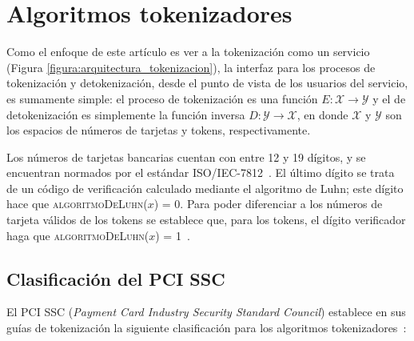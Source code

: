 %
%

\section{Algoritmos tokenizadores}
\label{sec:algoritmos}

Como el enfoque de este artículo es ver a la tokenización como un servicio
(Figura \ref{figura:arquitectura_tokenizacion}), la interfaz para los procesos
de tokenización y detokenización, desde el punto de vista de los usuarios del
servicio, es sumamente simple: el proceso de tokenización es una función $ E:
\mathcal{X} \rightarrow \mathcal{Y} $ y el de detokenización es  simplemente la
función inversa $ D: \mathcal{Y} \rightarrow \mathcal{X} $, en donde $
\mathcal{X} $ y $ \mathcal{Y} $ son los espacios de números de tarjetas y
tokens, respectivamente.

Los números de tarjetas bancarias cuentan con entre 12 y 19 dígitos, y se
encuentran normados por el estándar ISO/IEC-7812~\cite{iso_7812}. El último
dígito se trata de un código de verificación calculado mediante el algoritmo de
Luhn; este dígito hace que \textsc{algoritmoDeLuhn($ x $) = 0}. Para poder
diferenciar a los números de tarjeta válidos de los tokens se establece que,
para los tokens, el dígito verificador haga que
\textsc{algoritmoDeLuhn($ x $) = 1}~\cite{doc_sandra}.


\subsection{Clasificación del PCI SSC}
\label{sec:clasificacion}

El PCI SSC (\textit{Payment Card Industry Security Standard Council}) establece
en sus guías de tokenización la siguiente clasificación para los algoritmos
tokenizadores~\cite{pci_tokens}:

